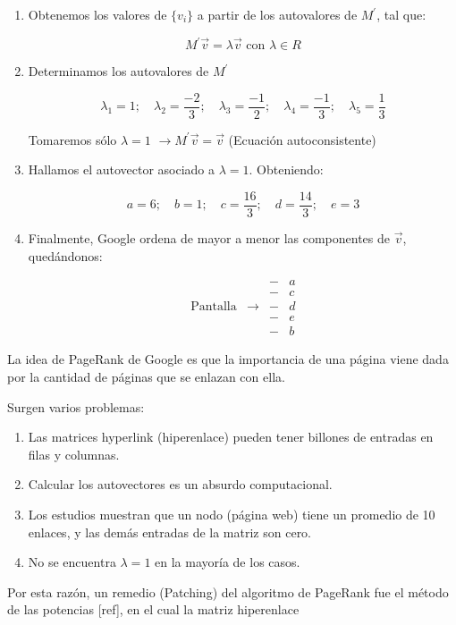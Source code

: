 \begin{enumerate}
\item Obtenemos los valores de $\{v_i\}$ a partir de los autovalores de $M^\prime$, tal que:

\[
M^\prime \vec{v} = \lambda \vec{v} \text{ con }\lambda \in R
\]

\item Determinamos los autovalores de $M^\prime$

\[
\lambda_1 = 1; \quad \lambda_2 = \frac{-2}{3}; \quad \lambda_3 = \frac{-1}{2}; \quad \lambda_4 = \frac{-1}{3}; \quad \lambda_5 = \frac{1}{3}
\]

Tomaremos sólo $\lambda = 1$ $\rightarrow M^\prime \vec{v} = \vec{v}$ (Ecuación autoconsistente)

\item Hallamos el autovector asociado a $\lambda = 1$. Obteniendo:

\[
a = 6; \quad b = 1; \quad c = \frac{16}{3}; \quad d = \frac{14}{3}; \quad e = 3
\]

\item Finalmente, Google ordena de mayor a menor las componentes de $\vec{v}$, quedándonos:

\[
\begin{matrix}
& & - & a \\
& & - & c \\
\text{Pantalla} & \rightarrow & - & d \\
& & - & e \\
& & - & b
\end{matrix}
\]
\end{enumerate}

La idea de PageRank de Google es que la importancia de una página viene dada por la cantidad de páginas que se enlazan con ella.

Surgen varios problemas:

\begin{enumerate}
  \item Las matrices hyperlink (hiperenlace) pueden tener billones de entradas en filas y columnas.
  \item Calcular los autovectores es un absurdo computacional.
  \item Los estudios muestran que un nodo (página web) tiene un promedio de 10 enlaces, y las demás entradas de la matriz son cero.
  \item No se encuentra $\lambda = 1$ en la mayoría de los casos.
\end{enumerate}

Por esta razón, un remedio (Patching) del algoritmo de PageRank fue el método de las potencias [ref], en el cual la matriz hiperenlace

